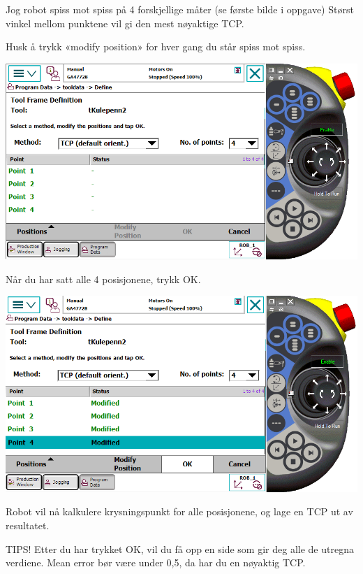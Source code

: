 \vspace{1cm}

Jog robot spiss mot spiss på 4 forskjellige måter (se første bilde
i oppgave) Størst vinkel mellom punktene vil gi den mest nøyaktige
TCP.

Husk å trykk «modify position» for hver gang du står spiss mot spiss.

\vspace{1cm}

\includegraphics[width=1\textwidth]{i04861x12}

\vspace{1cm}

Når du har satt alle 4 posisjonene, trykk OK.

\vspace{1cm}

\includegraphics[width=1\textwidth]{i04861x13}

Robot vil nå kalkulere krysningspunkt for alle posisjonene, og lage
en TCP ut av resultatet.

\vspace{1cm}

TIPS! Etter du har trykket OK, vil du få opp en side som gir deg alle
de utregna verdiene. Mean error bør være under 0,5, da har du en nøyaktig
TCP.

